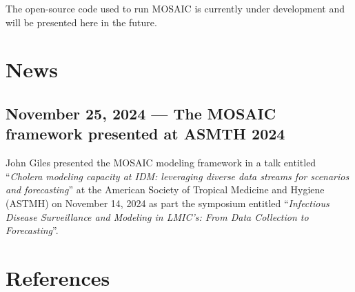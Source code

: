 \documentclass[
]{book}
\begin{document}
The open-source code used to run MOSAIC is currently under development and will be presented here in the future.

\chapter{News}\label{news}

\section*{November 25, 2024 --- The MOSAIC framework presented at ASMTH 2024}\label{november-25-2024-the-mosaic-framework-presented-at-asmth-2024}

John Giles presented the MOSAIC modeling framework in a talk entitled ``\emph{Cholera modeling capacity at IDM:
leveraging diverse data streams for scenarios and forecasting}'' at the American Society of Tropical Medicine and Hygiene (ASTMH) on November 14, 2024 as part the symposium entitled ``\emph{Infectious Disease Surveillance and Modeling in LMIC's: From Data Collection to Forecasting}''.

\chapter{References}\label{references}

  
\end{document}

